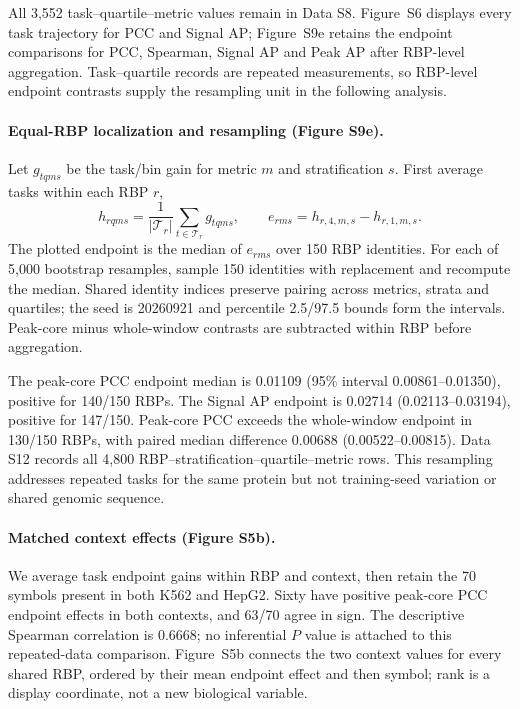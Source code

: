 \documentclass[11pt]{article}
\begin{document}
All 3,552 task--quartile--metric values remain in Data S8. Figure~S6 displays every task trajectory for PCC and Signal AP; Figure~S9e retains the endpoint comparisons for PCC, Spearman, Signal AP and Peak AP after RBP-level aggregation. Task--quartile records are repeated measurements, so RBP-level endpoint contrasts supply the resampling unit in the following analysis.

\paragraph{Equal-RBP localization and resampling (Figure S9e).} Let $g_{tqms}$ be the task/bin gain for metric $m$ and stratification $s$. First average tasks within each RBP $r$,
\begin{equation}
h_{rqms}=\frac{1}{|\mathcal T_r|}\sum_{t\in\mathcal T_r}g_{tqms},
\qquad e_{rms}=h_{r,4,m,s}-h_{r,1,m,s}.
\end{equation}
The plotted endpoint is the median of $e_{rms}$ over 150 RBP identities. For each of 5,000 bootstrap resamples, sample 150 identities with replacement and recompute the median. Shared identity indices preserve pairing across metrics, strata and quartiles; the seed is 20260921 and percentile 2.5/97.5 bounds form the intervals. Peak-core minus whole-window contrasts are subtracted within RBP before aggregation.

The peak-core PCC endpoint median is 0.01109 (95\% interval 0.00861--0.01350), positive for 140/150 RBPs. The Signal AP endpoint is 0.02714 (0.02113--0.03194), positive for 147/150. Peak-core PCC exceeds the whole-window endpoint in 130/150 RBPs, with paired median difference 0.00688 (0.00522--0.00815). Data S12 records all 4,800 RBP--stratification--quartile--metric rows. This resampling addresses repeated tasks for the same protein but not training-seed variation or shared genomic sequence.

\paragraph{Matched context effects (Figure S5b).} We average task endpoint gains within RBP and context, then retain the 70 symbols present in both K562 and HepG2. Sixty have positive peak-core PCC endpoint effects in both contexts, and 63/70 agree in sign. The descriptive Spearman correlation is 0.6668; no inferential $P$ value is attached to this repeated-data comparison. Figure~S5b connects the two context values for every shared RBP, ordered by their mean endpoint effect and then symbol; rank is a display coordinate, not a new biological variable.
\end{document}

